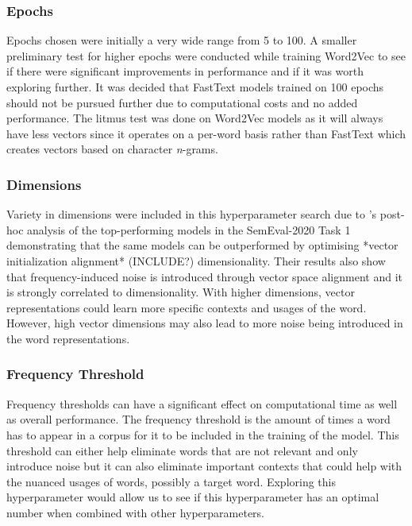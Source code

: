 \subsubsection{Epochs}
Epochs chosen were initially a very wide range from 5 to 100. A smaller preliminary test for higher epochs were conducted while training Word2Vec to see if there were significant improvements in performance and if it was worth exploring further. It was decided that FastText models trained on 100 epochs should not be pursued further due to computational costs and no added performance. The litmus test was done on Word2Vec models as it will always have less vectors since it operates on a per-word basis rather than FastText which creates vectors based on character \emph{n}-grams. 

\subsubsection{Dimensions}
Variety in dimensions were included in this hyperparameter search due to \citet{kaiser-etal-2020-ims}’s post-hoc analysis of the top-performing models in the SemEval-2020 Task 1 demonstrating that the same models can be outperformed by optimising *vector initialization alignment* (INCLUDE?) dimensionality. Their results also show that frequency-induced noise is introduced through vector space alignment and it is strongly correlated to dimensionality. With higher dimensions, vector representations could learn more specific contexts and usages of the word. However, high vector dimensions may also lead to more noise being introduced in the word representations. 

\subsubsection{Frequency Threshold}
Frequency thresholds can have a significant effect on computational time as well as overall performance. The frequency threshold is the amount of times a word has to appear in a corpus for it to be included in the training of the model. This threshold can either help eliminate words that are not relevant and only introduce noise but it can also eliminate important contexts that could help with the nuanced usages of words, possibly a target word. Exploring this hyperparameter would allow us to see if this hyperparameter has an optimal number when combined with other hyperparameters. 

